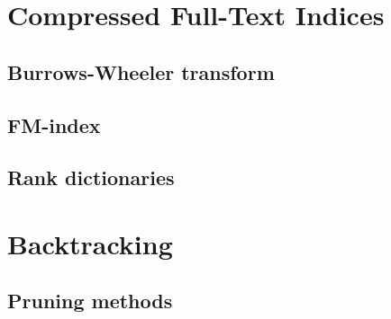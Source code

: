 \section{Compressed Full-Text Indices}
\subsection{Burrows-Wheeler transform}
\subsection{FM-index}
\subsection{Rank dictionaries}
\section{Backtracking}
\subsection{Pruning methods}
